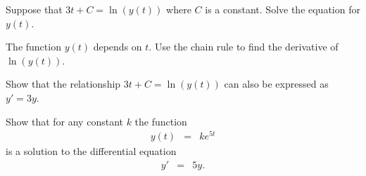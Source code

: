 \begin{problem}
  \item Suppose that $3t+C=\ln(y(t))$ where $C$ is a constant. Solve
    the equation for $y(t)$.

    \vfill

  \item The function $y(t)$ depends on $t$. Use the chain rule to find
    the derivative of $\ln(y(t))$.
    \vfill

    \clearpage

  \item Show that the relationship $3t+C=\ln(y(t))$ can also be
    expressed as $y'=3y$.

    \vfill

  \item Show that for any constant $k$ the function
    \begin{eqnarray*}
      y(t) & = & k e^{5t}
    \end{eqnarray*}
    is a solution to the differential equation 
    \begin{eqnarray*}
      y' & = & 5y.
    \end{eqnarray*}
    \vfill

\end{problem}
